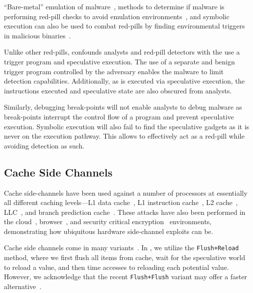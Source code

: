 
``Bare-metal'' emulation of malware~\cite{kirat2011barebox}, methods to
determine if malware is performing red-pill checks to avoid emulation
environments~\cite{kirat2014barecloud}, and symbolic execution can also be used
to combat red-pills by finding environmental triggers in malicious
binaries~\cite{schwartz2010all}. 

Unlike other red-pills, \speculake confounds analysts and red-pill detectors
with the use a trigger program and speculative execution. The use of a separate
and benign trigger program controlled by the adversary enables the \speculake
malware to limit detection capabilities. Additionally, as \speculake is executed
via speculative execution, the instructions executed and speculative state are 
also obscured from analysts. 

Similarly, debugging break-points will not enable analysts to debug \speculake
malware as break-points interrupt the control flow of a program and prevent
speculative execution. Symbolic execution will also fail to find the speculative
gadgets as it is never on the execution pathway. This allows \speculake to
effectively act as a red-pill while avoiding detection as such.

\subsection{Cache Side Channels}

Cache side-channels have been used against a number of processors at essentially
all different caching levels---L1 data
cache~\cite{percival2005cache,zhang2012cross,osvik2006cache}, L1 instruction
cache~\cite{aciiccmez2010new}, L2
cache~\cite{ristenpart2009hey,percival2005cache},
LLC~\cite{ristenpart2009hey,liu2015last}, and branch prediction
cache~\cite{aciiccmez2007power}. These attacks have also been performed in the
cloud~\cite{ristenpart2009hey,zhang2012cross},
browser~\cite{oren2015spy,google_cache_browser}, and security critical
encryption~\cite{yarom2014recovering,tromer2010efficient} environments,
demonstrating how ubiquitous hardware side-channel exploits can be. 

Cache side channels come in many
variants~\cite{neve2006refined,tromer2010efficient,yarom2014flush+,gruss2016flush+flush}.
In \speculake, we utilize the \texttt{Flush+Reload} method, where we first flush
all items from cache, wait for the speculative world to reload a value, and then
time accesses to reloading each potential value. However, we acknowledge that
the recent \texttt{Flush+Flush} variant may offer a faster
alternative~\cite{gruss2016flush+flush}.

